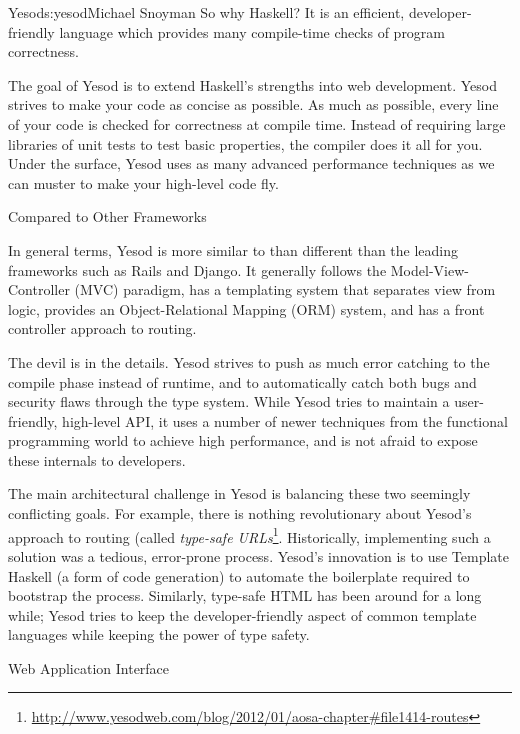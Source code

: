 \begin{aosachapter}{Yesod}{s:yesod}{Michael Snoyman}
So why Haskell? It is an efficient, developer-friendly language which
provides many compile-time checks of program correctness.

The goal of Yesod is to extend Haskell's strengths into web
development. Yesod strives to make your code as concise as
possible. As much as possible, every line of your code is checked for
correctness at compile time. Instead of requiring large libraries of
unit tests to test basic properties, the compiler does it all for
you. Under the surface, Yesod uses as many advanced performance
techniques as we can muster to make your high-level code fly.

\begin{aosasect1}{Compared to Other Frameworks}

In general terms, Yesod is more similar to than different than 
the leading frameworks such as Rails and Django. It generally
follows the Model-View-Controller (MVC) paradigm, has a templating
system that separates view from logic, provides an Object-Relational
Mapping (ORM) system, and has a front controller approach to routing.

The devil is in the details. Yesod strives to push as much error
catching to the compile phase instead of runtime, and to automatically
catch both bugs and security flaws through the type system. While
Yesod tries to maintain a user-friendly, high-level API, it uses a
number of newer techniques from the functional programming world to
achieve high performance, and is not afraid to expose these internals
to developers.

The main architectural challenge in Yesod is balancing these two
seemingly conflicting goals. For example, there is nothing
revolutionary about Yesod's approach to routing (called
\emph{type-safe URLs}\footnote{\url{http://www.yesodweb.com/blog/2012/01/aosa-chapter\#file1414-routes}}.
Historically, implementing such a solution was a tedious, error-prone
process. Yesod's innovation is to use Template Haskell (a form of code
generation) to automate the boilerplate required to bootstrap the
process. Similarly, type-safe HTML has been around for a long while;
Yesod tries to keep the developer-friendly aspect of common template
languages while keeping the power of type safety.

\end{aosasect1}

\begin{aosasect1}{Web Application Interface}


\end{aosasect1}
\end{aosachapter}
